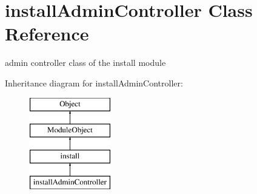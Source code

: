 \hypertarget{classinstallAdminController}{\section{install\-Admin\-Controller Class Reference}
\label{classinstallAdminController}
}


admin controller class of the install module  


Inheritance diagram for install\-Admin\-Controller\-:\begin{figure}[H]
\begin{center}
\leavevmode
\includegraphics[height=4.000000cm]{classinstallAdminController}
\end{center}
\end{figure}
